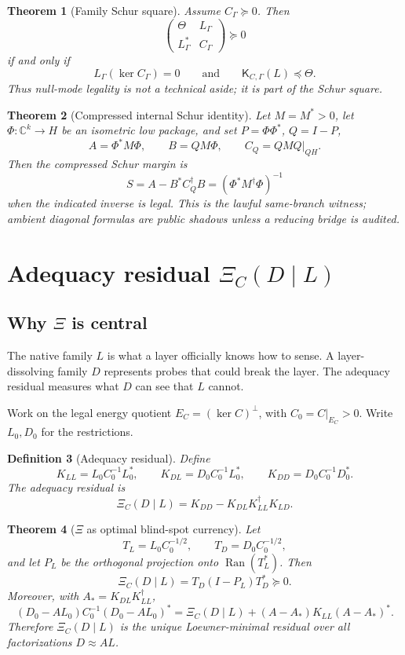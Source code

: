 \documentclass[11pt]{article}
\newtheorem{theorem}{Theorem}[section]
\newtheorem{definition}[theorem]{Definition}
\DeclareMathOperator{\range}{Ran}
\newcommand{\K}{\mathsf K}
\newcommand{\Loewner}{\preceq}
\begin{document}
\begin{theorem}[Family Schur square]
Assume \(C_\Gamma\succeq0\).  Then
\[
  \begin{pmatrix}\Theta&L_\Gamma\\L_\Gamma^*&C_\Gamma\end{pmatrix}\succeq0
\]
if and only if
\[
  L_\Gamma(\ker C_\Gamma)=0
  \qquad\text{and}\qquad
  \K_{C,\Gamma}(L)\Loewner\Theta.
\]
Thus null-mode legality is not a technical aside; it is part of the Schur square.
\end{theorem}

\begin{theorem}[Compressed internal Schur identity]
Let \(M=M^*>0\), let \(\Phi:\mathbb C^k\to H\) be an isometric low package, and set \(P=\Phi\Phi^*\), \(Q=I-P\),
\[
  A=\Phi^*M\Phi,\qquad B=QM\Phi,\qquad C_Q=QMQ|_{QH}.
\]
Then the compressed Schur margin is
\[
  S=A-B^*C_Q^\dagger B=(\Phi^*M^\dagger\Phi)^{-1}
\]
when the indicated inverse is legal.  This is the lawful same-branch witness; ambient diagonal formulas are public shadows unless a reducing bridge is audited.
\end{theorem}

\section{Adequacy residual \texorpdfstring{\(\Xi_C(D\mid L)\)}{Xi}}

\subsection{Why \(\Xi\) is central}
The native family \(L\) is what a layer officially knows how to sense.  A layer-dissolving family \(D\) represents probes that could break the layer.  The adequacy residual measures what \(D\) can see that \(L\) cannot.

Work on the legal energy quotient \(E_C=(\ker C)^\perp\), with \(C_0=C|_{E_C}>0\).  Write \(L_0,D_0\) for the restrictions.

\begin{definition}[Adequacy residual]
Define
\[
  K_{LL}=L_0C_0^{-1}L_0^*,\qquad
  K_{DL}=D_0C_0^{-1}L_0^*,\qquad
  K_{DD}=D_0C_0^{-1}D_0^*.
\]
The adequacy residual is
\[
  \boxed{\Xi_C(D\mid L)=K_{DD}-K_{DL}K_{LL}^\dagger K_{LD}.}
\]
\end{definition}

\begin{theorem}[\(\Xi\) as optimal blind-spot currency]
Let
\[
  T_L=L_0C_0^{-1/2},\qquad T_D=D_0C_0^{-1/2},
\]
and let \(P_L\) be the orthogonal projection onto \(\range(T_L^*)\).  Then
\[
  \Xi_C(D\mid L)=T_D(I-P_L)T_D^*\succeq0.
\]
Moreover, with \(A_*=K_{DL}K_{LL}^\dagger\),
\[
  (D_0-AL_0)C_0^{-1}(D_0-AL_0)^*
  =\Xi_C(D\mid L)+(A-A_*)K_{LL}(A-A_*)^*.
\]
Therefore \(\Xi_C(D\mid L)\) is the unique Loewner-minimal residual over all factorizations \(D\approx AL\).
\end{theorem}
\end{document}
